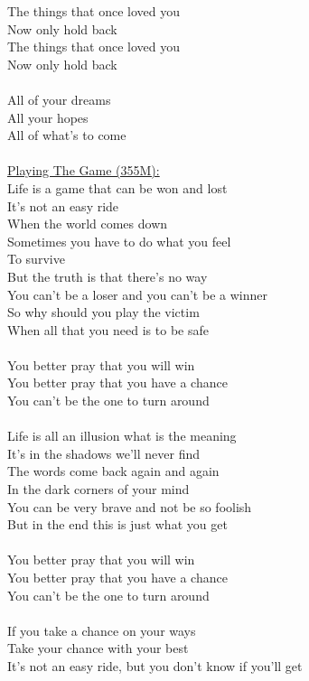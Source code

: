 \documentclass[11pt]{article}
\begin{document}
The things that once loved you\\
Now only hold back\\
The things that once loved you\\
Now only hold back\\
\\
All of your dreams\\
All your hopes\\
All of what's to come\\
\\
\underline{Playing The Game (355M):}\\
Life is a game that can be won and lost\\
It's not an easy ride\\
When the world comes down\\
Sometimes you have to do what you feel\\
To survive\\
But the truth is that there's no way\\
You can't be a loser and you can't be a winner\\
So why should you play the victim\\
When all that you need is to be safe\\
\\
You better pray that you will win\\
You better pray that you have a chance\\
You can't be the one to turn around\\
\\
Life is all an illusion what is the meaning\\
It's in the shadows we'll never find\\
The words come back again and again\\
In the dark corners of your mind\\
You can be very brave and not be so foolish\\
But in the end this is just what you get\\
\\
You better pray that you will win\\
You better pray that you have a chance\\
You can't be the one to turn around\\
\\
If you take a chance on your ways\\
Take your chance with your best\\
It's not an easy ride, but you don't know if you'll get\\
\end{document}
